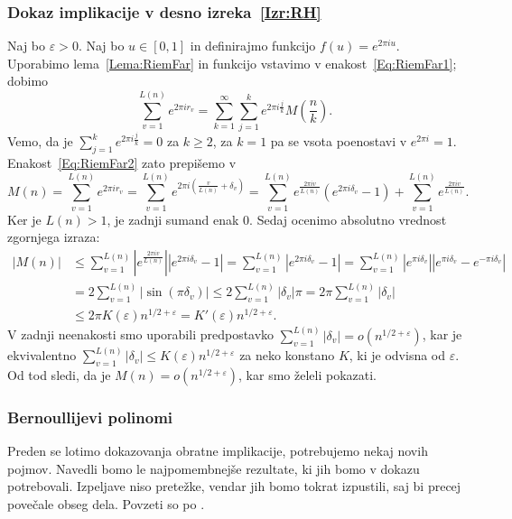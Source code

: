 \documentclass[mat1]{fmfdelo}
\begin{document}
\subsubsection{Dokaz implikacije v desno izreka~\ref{Izr:RH}}
%
Naj bo $\varepsilon > 0$. Naj bo $u \in [0,1]$ in definirajmo funkcijo $f(u) = e^{2\pi iu}$. Uporabimo lema~\ref{Lema:RiemFar} in funkcijo vstavimo v enakost~\eqref{Eq:RiemFar1}; dobimo
\begin{equation}
\label{Eq:RiemFar2}
	\sum_{v=1}^{L(n)} e^{2\pi i r_{v}} = \sum_{k=1}^{\infty} \sum_{j=1}^{k} e^{2\pi i \frac{j}{k}} M \left(\frac{n}{k} \right).
\end{equation}
Vemo, da je $\sum_{j=1}^{k} e^{2\pi i \frac{j}{k}} = 0$ za $k \geq 2$, za $k=1$ pa se vsota poenostavi v $e^{2\pi i} = 1$.
Enakost~\eqref{Eq:RiemFar2} zato prepišemo v 
\[ M(n) = \sum_{v=1}^{L(n)} e^{2\pi i r_{v}} = \sum_{v=1}^{L(n)} e^{2\pi i \left(\frac{v}{L(n)} + \delta_{v} \right)} 
	   = \sum_{v=1}^{L(n)} e^{ \frac{2\pi i v}{L(n)} } \left(e^{2\pi i \delta_{v}} - 1 \right) + \sum_{v=1}^{L(n)} e^{ \frac{2\pi iv}{L(n)} }. \]
Ker je $L(n) > 1$, je zadnji sumand enak $0$. Sedaj ocenimo absolutno vrednost zgornjega izraza:
\begin{align*} 
|M(n)| &\leq \sum_{v=1}^{L(n)} \left|e^{ \frac{2\pi i v}{L(n)} } \right| \left|e^{2\pi i \delta_{v}} - 1 \right| 
	= \sum_{v=1}^{L(n)} \left|e^{2\pi i \delta_{v}} - 1 \right|
	= \sum_{v=1}^{L(n)} \left|e^{\pi i \delta_{v} } \right| \left|e^{\pi i \delta_{v}} - e^{-\pi i \delta_{v}}\right| \\
	&= 2 \sum_{v=1}^{L(n)} |\sin{(\pi \delta_{v})}| \leq 2 \sum_{v=1}^{L(n)} |\delta_{v}| \pi = 2 \pi \sum_{v=1}^{L(n)} |\delta_{v}| \\
	&\leq 2 \pi K(\varepsilon) n^{1/2 + \varepsilon} = K'(\varepsilon) n^{1/2 + \varepsilon}.
\end{align*}
V zadnji neenakosti smo uporabili predpostavko $ \sum_{v=1}^{L(n)}|\delta_{v}| = o(n^{1/2+\varepsilon}) $, kar je ekvivalentno 
$ \sum_{v=1}^{L(n)}|\delta_{v}| \leq K(\varepsilon) n^{1/2+\varepsilon}$ za neko konstano $K$, ki je odvisna od $\varepsilon$.
Od tod sledi, da je $M(n) = o(n^{1/2 + \varepsilon})$, kar smo želeli pokazati.

\subsubsection{Bernoullijevi polinomi}
Preden se lotimo dokazovanja obratne implikacije, potrebujemo nekaj novih pojmov. Navedli bomo le najpomembnejše rezultate, ki jih bomo v dokazu potrebovali. Izpeljave niso pretežke, vendar jih bomo tokrat izpustili, saj bi precej povečale obseg dela. Povzeti so po \cite[poglavje 6.2]{zetafunction}.
\end{document}
